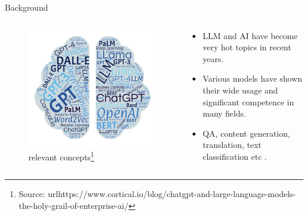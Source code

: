 \documentclass[t]{beamer}
\begin{document}
\begin{frame}{Background}
  \begin{columns}
    \begin{column}{0.4\textwidth}
        \begin{figure}
            \centering
            \includegraphics[width=\textwidth]{llm1.png}
            \caption{relevant concepts\footnote{Source: url{https://www.cortical.io/blog/chatgpt-and-large-language-models-the-holy-grail-of-enterprise-ai/}}}
            \label{fig:llm1}
        \end{figure}
    \end{column}
    \begin{column}{0.5\textwidth}
        \begin{itemize}
            \item LLM and AI have become very hot topics in recent years.
            \item Various models have shown their wide usage and significant competence in many fields.
            \item QA, content generation, translation, text classification etc \cite{Liu23}.
        \end{itemize}
    \end{column}
\end{columns}
\end{frame}
\end{document}
